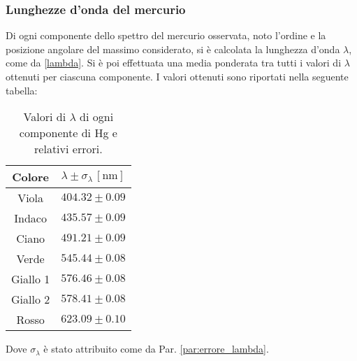 \documentclass[]{article}
\begin{document}
    \subsubsection{Lunghezze d'onda del mercurio}
    Di ogni componente dello spettro del mercurio osservata, noto l'ordine e la posizione angolare del massimo considerato, si è calcolata la lunghezza d'onda $\lambda$, come da \ref{lambda}. Si è poi effettuata una media ponderata tra tutti i valori di $\lambda$ ottenuti per ciascuna componente. I valori ottenuti sono riportati nella seguente tabella:
    \begin{table}[H]
        \centering
        \begin{tabular}{||c|c||}
            \hline
            Colore & $\lambda \pm \sigma_{\lambda} \, \left[\text{nm}\right] $\\
            \hline \hline
            Viola    & $ 404.32 \pm 0.09 $ \\\hline
            Indaco   & $ 435.57 \pm 0.09 $ \\\hline
            Ciano    & $ 491.21 \pm 0.09 $ \\\hline
            Verde    & $ 545.44 \pm 0.08 $ \\\hline
            Giallo 1 & $ 576.46 \pm 0.08 $ \\\hline
            Giallo 2 & $ 578.41 \pm 0.08 $ \\\hline
            Rosso    & $ 623.09 \pm 0.10 $ \\\hline
        \end{tabular}
        \caption{Valori di $\lambda$ di ogni componente di Hg e relativi errori.}
        \label{lambda-Hg-values}
    \end{table}
    Dove $\sigma_{\lambda}$ è stato attribuito come da Par. \ref{par:errore_lambda}.
\end{document}
